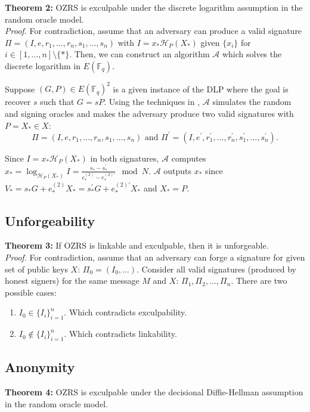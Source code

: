 \documentclass{article}
\newcommand{\sidx}{\ensuremath{*}}
\newcommand{\ix}{\ensuremath{x_i}}
\newcommand{\sx}{\ensuremath{x_\sidx}}
\newcommand{\spk}{\ensuremath{X_\sidx}}
\newcommand{\alg}{\ensuremath{\mathcal{A}}}
\newcommand{\hp}{\ensuremath{\mathcal{H}_P}}
\newcommand{\curve}{\ensuremath{E(\mathbb{F}_q)}}
\begin{document}
{\bf Theorem 2:} OZRS is exculpable under the discrete logarithm assumption in
the random oracle model. \\

{\it Proof.} For contradiction, assume that an adversary can produce a valid
signature $\Pi=(I, e, r_1, \dots, r_n, s_1, \dots, s_n)$ with $I = \sx
\hp(\spk)$ given $\{\ix\}$ for $i \in [1,\dots,n] \setminus \{*\}$.  Then, we
can construct an algorithm {\alg} which solves the discrete logarithm in
{\curve}.

Suppose $(G, P) \in \curve^2$ is a given instance of the DLP where the goal is
recover $s$ such that $G = sP$.  Using the techniques in \cite{HOLYGRAIL},
{\alg} simulates the random and signing oracles and makes the adversary produce
two valid signatures with $P = \spk \in X$: 
\[
\Pi = (I,e,r_1,\dots,r_n,s_1,\dots,s_n) 
\text{~and~} 
\Pi^\prime = (I,e^\prime,r_1^\prime,\dots,r_n^\prime,s_1^\prime,\dots,s_n^\prime).
\]

Since $I = \sx \hp(\spk)$ in both signatures, {\alg} computes $\sx =
\log_{\hp(\spk)} I = \frac{s_* - s_*^\prime}{e_*^{(2)} - e_*^{(2)\prime}} \mod
N$. {\alg} outputs $\sx$ since $V_* = s_* G + e_*^{(2)} \spk = s_*^\prime G +
e_*^{(2)\prime} \spk$ and $\spk = P$.

\subsection{Unforgeability}

{\bf Theorem 3:} If OZRS is linkable and exculpable, then it is unforgeable. \\

{\it Proof.}  For contradiction, assume that an adversary can forge a signature
for given set of public keys $X$: $\Pi_0 = (I_0,\dots)$.  Consider all valid
signatures (produced by honest signers) for the same message $M$ and $X$:
$\Pi_1, \Pi_2, \dots, \Pi_n$.  There are two possible cases:
\begin{enumerate}
  \item $I_0 \in \{I_i\}_{i=1}^n$.  Which contradicts exculpability.
  \item $I_0 \notin \{I_i\}_{i=1}^n$.  Which contradicts linkability.
\end{enumerate}

\subsection{Anonymity}

{\bf Theorem 4:} OZRS is exculpable under the decisional Diffie-Hellman
assumption in the random oracle model.
\end{document}
